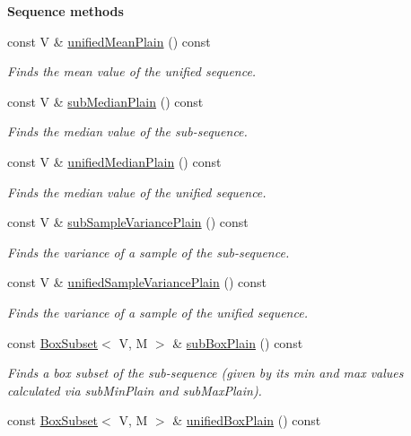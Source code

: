 \begin{Indent}{\bf Sequence methods}
\begin{DoxyCompactItemize}
const V \& \hyperlink{class_q_u_e_s_o_1_1_base_vector_sequence_a64ad551265df354e8c4ccff0d14cb883}{unified\-Mean\-Plain} () const 
\begin{DoxyCompactList}\small\item\em Finds the mean value of the unified sequence. \end{DoxyCompactList}\item 
const V \& \hyperlink{class_q_u_e_s_o_1_1_base_vector_sequence_a679cf7f46c588ed4ba75beeb8fe8ae2d}{sub\-Median\-Plain} () const 
\begin{DoxyCompactList}\small\item\em Finds the median value of the sub-\/sequence. \end{DoxyCompactList}\item 
const V \& \hyperlink{class_q_u_e_s_o_1_1_base_vector_sequence_acdb70319baecc3985e56b9e85502e3cf}{unified\-Median\-Plain} () const 
\begin{DoxyCompactList}\small\item\em Finds the median value of the unified sequence. \end{DoxyCompactList}\item 
const V \& \hyperlink{class_q_u_e_s_o_1_1_base_vector_sequence_a9de650586582d258eb977444d83286a6}{sub\-Sample\-Variance\-Plain} () const 
\begin{DoxyCompactList}\small\item\em Finds the variance of a sample of the sub-\/sequence. \end{DoxyCompactList}\item 
const V \& \hyperlink{class_q_u_e_s_o_1_1_base_vector_sequence_a34a8b31757c6b728feefcf396d62c12f}{unified\-Sample\-Variance\-Plain} () const 
\begin{DoxyCompactList}\small\item\em Finds the variance of a sample of the unified sequence. \end{DoxyCompactList}\item 
const \hyperlink{class_q_u_e_s_o_1_1_box_subset}{Box\-Subset}$<$ V, M $>$ \& \hyperlink{class_q_u_e_s_o_1_1_base_vector_sequence_a5c5ede038fbdb296e3913bc39142b7ff}{sub\-Box\-Plain} () const 
\begin{DoxyCompactList}\small\item\em Finds a box subset of the sub-\/sequence (given by its min and max values calculated via sub\-Min\-Plain and sub\-Max\-Plain). \end{DoxyCompactList}\item 
const \hyperlink{class_q_u_e_s_o_1_1_box_subset}{Box\-Subset}$<$ V, M $>$ \& \hyperlink{class_q_u_e_s_o_1_1_base_vector_sequence_a69757707519d6d10b454c36ee624fecc}{unified\-Box\-Plain} () const 

\end{DoxyCompactItemize}
\end{Indent}

